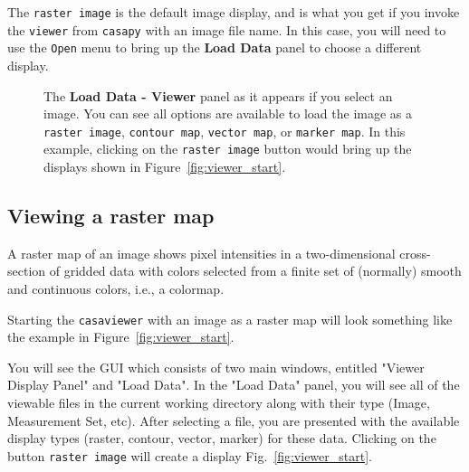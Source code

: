 The {\tt raster image} is the default image display, and is what you
get if you invoke the {\tt viewer} from {\tt casapy} with an image
file name.  In this case, you will need to use the {\tt Open} menu to
bring up the {\bf Load Data} panel to choose a different display.

\begin{figure}[h!]
\begin{center}
\caption{\label{fig:viewer_load_image} The {\bf Load Data - Viewer} panel
as it appears if you select an image.  You can see all options
are available to load the image as a {\tt raster image}, 
{\tt contour map}, {\tt vector map}, or {\tt marker map}.
In this example, clicking on the {\tt raster image} button would 
bring up the displays shown in Figure~\ref{fig:viewer_start}.}
\hrulefill
\end{center}
\end{figure}


\subsection{Viewing a raster map}
\label{section:display.image.raster}

A raster map of an image shows pixel intensities in a two-dimensional
cross-section of gridded data with colors selected from a finite set
of (normally) smooth and continuous colors, i.e., a colormap.


Starting the {\tt casaviewer} with an image as a raster map will look
something like the example in Figure~\ref{fig:viewer_start}. 
 
You will see the GUI which consists of two main windows, entitled
"Viewer Display Panel" and "Load Data". In the "Load Data" panel, you
will see all of the viewable files in the current working directory along
with their type (Image, Measurement Set, etc).  After selecting a file, you
are presented with the available display types (raster, contour,
vector, marker) for these data. Clicking
on the button {\tt raster image} will create a display
Fig.~\ref{fig:viewer_start}. 

